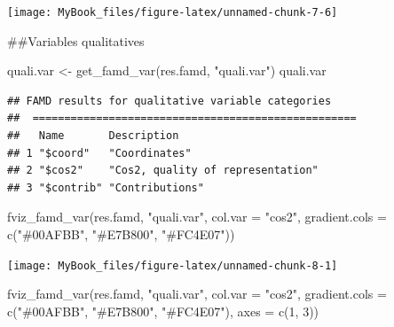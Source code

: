 \documentclass[
  12pt,
  american,
  a4paper,
  extrafontsizes,onecolumn,openright
  ]{memoir}
\newenvironment{Shaded}{\begin{snugshade}}{\end{snugshade}}
\newcommand{\AttributeTok}[1]{\textcolor[rgb]{0.77,0.63,0.00}{#1}}
\newcommand{\DecValTok}[1]{\textcolor[rgb]{0.00,0.00,0.81}{#1}}
\newcommand{\FunctionTok}[1]{\textcolor[rgb]{0.00,0.00,0.00}{#1}}
\newcommand{\NormalTok}[1]{#1}
\newcommand{\OtherTok}[1]{\textcolor[rgb]{0.56,0.35,0.01}{#1}}
\newcommand{\StringTok}[1]{\textcolor[rgb]{0.31,0.60,0.02}{#1}}
\begin{document}
\begin{center}\texttt{[image: MyBook\_files/figure-latex/unnamed-chunk-7-6]} \end{center}

\normalsize

\#\#Variables qualitatives

\scriptsize

\begin{Shaded}
\begin{Highlighting}[]
\NormalTok{quali.var }\OtherTok{\textless{}{-}} \FunctionTok{get\_famd\_var}\NormalTok{(res.famd, }\StringTok{"quali.var"}\NormalTok{)}
\NormalTok{quali.var}
\end{Highlighting}
\end{Shaded}

\begin{verbatim}
## FAMD results for qualitative variable categories 
##  ===================================================
##   Name       Description                      
## 1 "$coord"   "Coordinates"                    
## 2 "$cos2"    "Cos2, quality of representation"
## 3 "$contrib" "Contributions"
\end{verbatim}

\begin{Shaded}
\begin{Highlighting}[]
\FunctionTok{fviz\_famd\_var}\NormalTok{(res.famd, }\StringTok{"quali.var"}\NormalTok{, }\AttributeTok{col.var =} \StringTok{"cos2"}\NormalTok{, }\AttributeTok{gradient.cols =} \FunctionTok{c}\NormalTok{(}\StringTok{"\#00AFBB"}\NormalTok{,}
    \StringTok{"\#E7B800"}\NormalTok{, }\StringTok{"\#FC4E07"}\NormalTok{))}
\end{Highlighting}
\end{Shaded}

\begin{center}\texttt{[image: MyBook\_files/figure-latex/unnamed-chunk-8-1]} \end{center}

\begin{Shaded}
\begin{Highlighting}[]
\FunctionTok{fviz\_famd\_var}\NormalTok{(res.famd, }\StringTok{"quali.var"}\NormalTok{, }\AttributeTok{col.var =} \StringTok{"cos2"}\NormalTok{, }\AttributeTok{gradient.cols =} \FunctionTok{c}\NormalTok{(}\StringTok{"\#00AFBB"}\NormalTok{,}
    \StringTok{"\#E7B800"}\NormalTok{, }\StringTok{"\#FC4E07"}\NormalTok{), }\AttributeTok{axes =} \FunctionTok{c}\NormalTok{(}\DecValTok{1}\NormalTok{, }\DecValTok{3}\NormalTok{))}
\end{Highlighting}
\end{Shaded}
\end{document}
